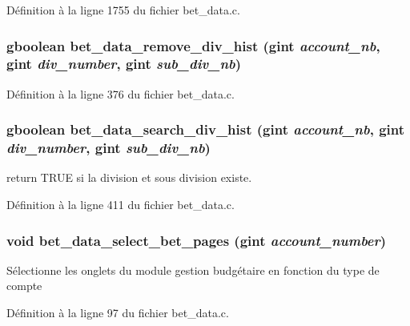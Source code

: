 Définition à la ligne 1755 du fichier bet\_\-data.c.

\subsubsection[{bet\_\-data\_\-remove\_\-div\_\-hist}]{\setlength{\rightskip}{0pt plus 5cm}gboolean bet\_\-data\_\-remove\_\-div\_\-hist (gint {\em account\_\-nb}, \/  gint {\em div\_\-number}, \/  gint {\em sub\_\-div\_\-nb})}\label{bet__data_8c_a2ad8c256ef5056925b921a71d8645578}


Définition à la ligne 376 du fichier bet\_\-data.c.

\subsubsection[{bet\_\-data\_\-search\_\-div\_\-hist}]{\setlength{\rightskip}{0pt plus 5cm}gboolean bet\_\-data\_\-search\_\-div\_\-hist (gint {\em account\_\-nb}, \/  gint {\em div\_\-number}, \/  gint {\em sub\_\-div\_\-nb})}\label{bet__data_8c_aa5a0bad0ab672a04b4dfa18d9816aa20}
return TRUE si la division et sous division existe. 

Définition à la ligne 411 du fichier bet\_\-data.c.

\subsubsection[{bet\_\-data\_\-select\_\-bet\_\-pages}]{\setlength{\rightskip}{0pt plus 5cm}void bet\_\-data\_\-select\_\-bet\_\-pages (gint {\em account\_\-number})}\label{bet__data_8c_a1056a006e9aa525d168c86363029d44e}
Sélectionne les onglets du module gestion budgétaire en fonction du type de compte 

Définition à la ligne 97 du fichier bet\_\-data.c.

